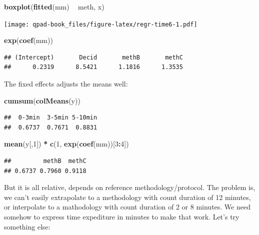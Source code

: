 \documentclass[12pt,]{book}
\newenvironment{Shaded}{\begin{snugshade}}{\end{snugshade}}
\newcommand{\DecValTok}[1]{\textcolor[rgb]{0.00,0.00,0.81}{#1}}
\newcommand{\KeywordTok}[1]{\textcolor[rgb]{0.13,0.29,0.53}{\textbf{#1}}}
\newcommand{\NormalTok}[1]{#1}
\newcommand{\OperatorTok}[1]{\textcolor[rgb]{0.81,0.36,0.00}{\textbf{#1}}}
\newcommand{\StringTok}[1]{\textcolor[rgb]{0.31,0.60,0.02}{#1}}
\begin{document}
\begin{Shaded}
\begin{Highlighting}[]
\KeywordTok{boxplot}\NormalTok{(}\KeywordTok{fitted}\NormalTok{(mm) }\OperatorTok{~}\StringTok{ }\NormalTok{meth, x)}
\end{Highlighting}
\end{Shaded}

\texttt{[image: qpad-book\_files/figure-latex/regr-time6-1.pdf]}

\begin{Shaded}
\begin{Highlighting}[]
\KeywordTok{exp}\NormalTok{(}\KeywordTok{coef}\NormalTok{(mm))}
\end{Highlighting}
\end{Shaded}

\begin{verbatim}
## (Intercept)       Decid       methB       methC 
##      0.2319      8.5421      1.1816      1.3535
\end{verbatim}

The fixed effects adjusts the means well:

\begin{Shaded}
\begin{Highlighting}[]
\KeywordTok{cumsum}\NormalTok{(}\KeywordTok{colMeans}\NormalTok{(y))}
\end{Highlighting}
\end{Shaded}

\begin{verbatim}
##  0-3min  3-5min 5-10min 
##  0.6737  0.7671  0.8831
\end{verbatim}

\begin{Shaded}
\begin{Highlighting}[]
\KeywordTok{mean}\NormalTok{(y[,}\DecValTok{1}\NormalTok{]) }\OperatorTok{*}\StringTok{ }\KeywordTok{c}\NormalTok{(}\DecValTok{1}\NormalTok{, }\KeywordTok{exp}\NormalTok{(}\KeywordTok{coef}\NormalTok{(mm))[}\DecValTok{3}\OperatorTok{:}\DecValTok{4}\NormalTok{])}
\end{Highlighting}
\end{Shaded}

\begin{verbatim}
##         methB  methC 
## 0.6737 0.7960 0.9118
\end{verbatim}

But it is all relative, depends on reference methodology/protocol.
The problem is, we can't easily extrapolate to a methodology
with count duration of 12 minutes, or interpolate to a mathodology
with count duration of 2 or 8 minutes.
We need somehow to express time expediture in minutes to make that work.
Let's try something else:
\end{document}
